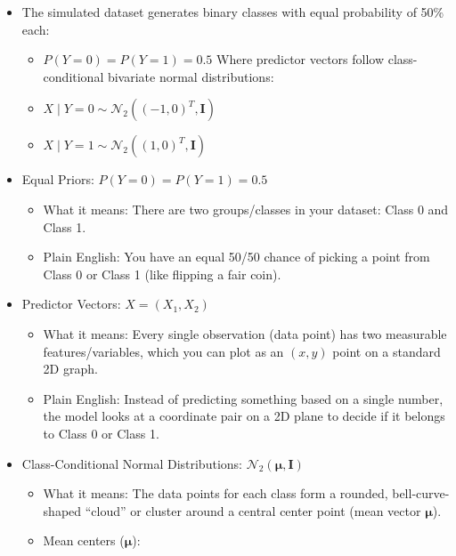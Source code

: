 \documentclass[
  letterpaper,
  DIV=11,
  numbers=noendperiod]{scrreprt}
\providecommand{\tightlist}{%
  \setlength{\itemsep}{0pt}\setlength{\parskip}{0pt}}
\begin{document}
\begin{itemize}
\tightlist
\item
  The simulated dataset generates binary classes with equal probability
  of 50\% each:

  \begin{itemize}
  \tightlist
  \item
    \(P(Y = 0) = P(Y = 1) = 0.5\) Where predictor vectors follow
    class-conditional bivariate normal distributions:
  \item
    \(X \mid Y=0 \sim \mathcal{N}_2((-1,0)^T, \mathbf{I})\)
  \item
    \(X \mid Y=1 \sim \mathcal{N}_2((1,0)^T, \mathbf{I})\)
  \end{itemize}
\item
  Equal Priors: \(P(Y = 0) = P(Y = 1) = 0.5\)

  \begin{itemize}
  \tightlist
  \item
    What it means: There are two groups/classes in your dataset: Class 0
    and Class 1.
  \item
    Plain English: You have an equal 50/50 chance of picking a point
    from Class 0 or Class 1 (like flipping a fair coin).
  \end{itemize}
\item
  Predictor Vectors: \(X = (X_1, X_2)\)

  \begin{itemize}
  \tightlist
  \item
    What it means: Every single observation (data point) has two
    measurable features/variables, which you can plot as an \((x, y)\)
    point on a standard 2D graph.
  \item
    Plain English: Instead of predicting something based on a single
    number, the model looks at a coordinate pair on a 2D plane to decide
    if it belongs to Class 0 or Class 1.
  \end{itemize}
\item
  Class-Conditional Normal Distributions:
  \(\mathcal{N}_2(\boldsymbol{\mu}, \mathbf{I})\)

  \begin{itemize}
  \tightlist
  \item
    What it means: The data points for each class form a rounded,
    bell-curve-shaped ``cloud'' or cluster around a central center point
    (mean vector \(\boldsymbol{\mu}\)).
  \item
    Mean centers (\(\boldsymbol{\mu}\)):


\end{itemize}
\end{itemize}
\end{document}
